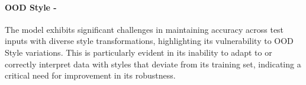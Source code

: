 \paragraph{OOD Style - \high}
The model exhibits significant challenges in maintaining accuracy across test inputs with diverse style transformations, highlighting its vulnerability to OOD Style variations. This is particularly evident in its inability to adapt to or correctly interpret data with styles that deviate from its training set, indicating a critical need for improvement in its robustness. 

